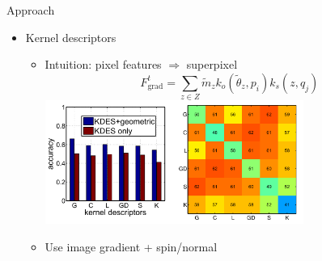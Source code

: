 \documentclass[12pt]{beamer}
\begin{document}
\begin{frame}{Approach}
	\begin{itemize}
		\item Kernel descriptors
		\begin{itemize}
			\item Intuition: pixel features $\Rightarrow$ superpixel
			\[F_\text{grad}^t = \sum_{z\in Z}\tilde{m}_zk_o(\tilde{\theta}_z, p_i)k_s(z, q_j)\]
			\includegraphics[width=0.7\textwidth]{fig3.png} \\
			\item Use image gradient + spin/normal
		\end{itemize}
	\end{itemize}
\end{frame}
\end{document}

